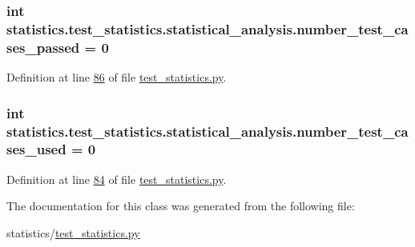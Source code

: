 \subsubsection[{number\+\_\+test\+\_\+cases\+\_\+passed}]{\setlength{\rightskip}{0pt plus 5cm}int statistics.\+test\+\_\+statistics.\+statistical\+\_\+analysis.\+number\+\_\+test\+\_\+cases\+\_\+passed = 0\hspace{0.3cm}{\ttfamily [static]}}\label{classstatistics_1_1test__statistics_1_1statistical__analysis_ac7555db570919cec38a8325d8427093e}


Definition at line \hyperlink{test__statistics_8py_source_l00086}{86} of file \hyperlink{test__statistics_8py_source}{test\+\_\+statistics.\+py}.

\hypertarget{classstatistics_1_1test__statistics_1_1statistical__analysis_afed7a27a010e7377d2719b315d5d5f17}{}
\subsubsection[{number\+\_\+test\+\_\+cases\+\_\+used}]{\setlength{\rightskip}{0pt plus 5cm}int statistics.\+test\+\_\+statistics.\+statistical\+\_\+analysis.\+number\+\_\+test\+\_\+cases\+\_\+used = 0\hspace{0.3cm}{\ttfamily [static]}}\label{classstatistics_1_1test__statistics_1_1statistical__analysis_afed7a27a010e7377d2719b315d5d5f17}


Definition at line \hyperlink{test__statistics_8py_source_l00084}{84} of file \hyperlink{test__statistics_8py_source}{test\+\_\+statistics.\+py}.



The documentation for this class was generated from the following file\+:\begin{DoxyCompactItemize}
\item 
statistics/\hyperlink{test__statistics_8py}{test\+\_\+statistics.\+py}\end{DoxyCompactItemize}
